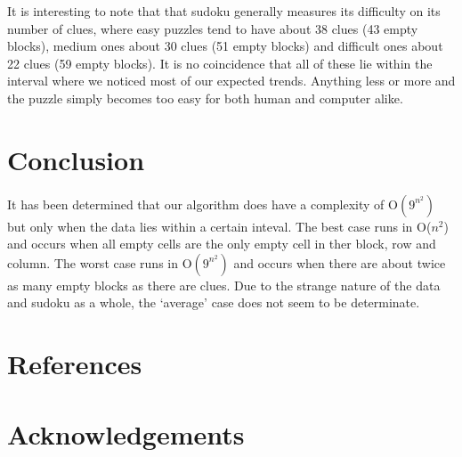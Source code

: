 \documentclass{article}
\begin{document}
    It is interesting to note that that sudoku generally measures its difficulty on its number of clues, where easy puzzles tend to have about 38 clues (43 empty blocks), medium ones about 30 clues (51 empty blocks) and difficult ones about 22 clues (59 empty blocks). It is no coincidence that all of these lie within the interval where we noticed most of our expected trends. Anything less or more and the puzzle simply becomes too easy for both human and computer alike. 

    \section{Conclusion}
    It has been determined that our algorithm does have a complexity of O$(9^{n^2})$  but only when the data lies within a certain inteval. The best case runs in O($n^2$) and occurs when all empty cells are the only empty cell in ther block, row and column. The worst case runs in O$(9^{n^2})$ and occurs when there are about twice as many empty blocks as there are clues. Due to the strange nature of the data and sudoku as a whole, the ‘average’ case does not seem to be determinate.

    \pagebreak
    \section{References}
    
    

    \section{Acknowledgements}
\end{document}

